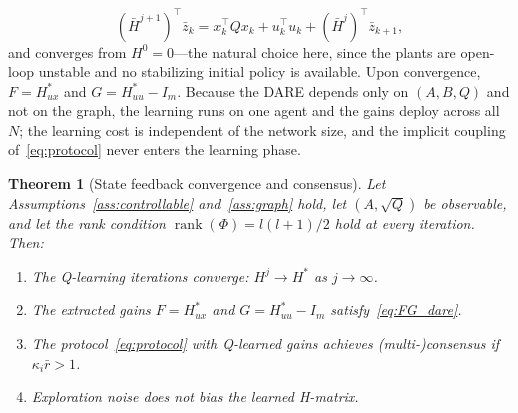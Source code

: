 \documentclass[final,5p,times]{elsarticle}
\theoremstyle{plain}
\newtheorem{theorem}{Theorem}
\theoremstyle{definition}
\theoremstyle{remark}
\DeclareMathOperator{\rank}{rank}
\begin{document}
\begin{equation}
(\bar{H}^{j+1})^\top \bar{z}_k = x_k^\top Q x_k + u_k^\top u_k + (\bar{H}^j)^\top \bar{z}_{k+1},
\label{eq:vi_update}
\end{equation}
and converges from $H^0 = 0$---the natural choice here, since the plants are open-loop unstable and no stabilizing initial policy is available. Upon convergence, $F = H_{ux}^*$ and $G = H_{uu}^* - I_m$. Because the DARE depends only on $(A,B,Q)$ and not on the graph, the learning runs on one agent and the gains deploy across all $N$; the learning cost is independent of the network size, and the implicit coupling of~\eqref{eq:protocol} never enters the learning phase.
\begin{theorem}[State feedback convergence and consensus]
\label{thm:sf_convergence}
Let Assumptions~\ref{ass:controllable} and~\ref{ass:graph} hold, let $(A, \sqrt{Q})$ be observable, and let the rank condition $\rank(\Phi) = l(l+1)/2$ hold at every iteration. Then:
\begin{enumerate}
    \item[(i)] The Q-learning iterations converge: $H^j \to H^*$ as $j \to \infty$.
    \item[(ii)] The extracted gains $F = H_{ux}^*$ and $G = H_{uu}^* - I_m$ satisfy~\eqref{eq:FG_dare}.
    \item[(iii)] The protocol~\eqref{eq:protocol} with Q-learned gains achieves (multi-)consensus if $\kappa_i \bar{r} > 1$.
    \item[(iv)] Exploration noise does not bias the learned H-matrix.
\end{enumerate}
\end{theorem}
\end{document}
